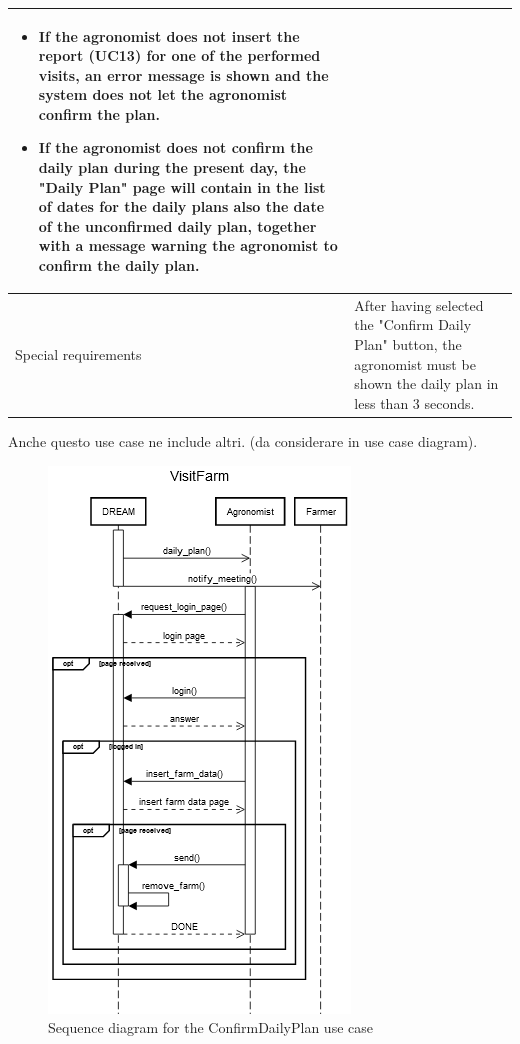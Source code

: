 \documentclass{article}
\begin{document}
\begin{longtable}{|p{3.5cm}|m{8cm}|}
\begin{itemize}
     \item If the agronomist does not insert the report (UC13) for one of the performed visits, an error message is shown and the system does not let the agronomist confirm the plan.
     \item If the agronomist does not confirm the daily plan during the present day, the "Daily Plan" page will contain in the list of dates for the daily plans also the date of the unconfirmed daily plan, together with a message warning the agronomist to confirm the daily plan.
 \end{itemize}\\
 \hline
 Special requirements & After having selected the "Confirm Daily Plan" button, the agronomist must be shown the daily plan in less than 3 seconds.\\
 \hline
\end{longtable}

\color{red}
Anche questo use case ne include altri. (da considerare in use case diagram).
\color{black}

\begin{figure}[H]
    \centering
    \includegraphics[scale=0.75]{sequence_diagrams/VisitFarm}
    \caption{Sequence diagram for the ConfirmDailyPlan use case}
\end{figure}
\end{document}
